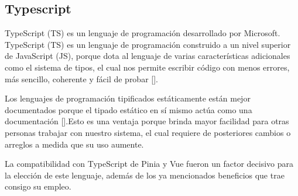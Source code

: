 %

\subsection{Typescript}

TypeScript (TS) es un lenguaje de programación desarrollado por Microsoft. TypeScript (TS) es un lenguaje de programación construido a un nivel superior de JavaScript (JS), porque dota al lenguaje de varias características adicionales como el sistema de tipos, el cual nos permite escribir código con menos errores, más sencillo, coherente y fácil de probar [\cite{58, 59}]. 

Los lenguajes de programación tipificados estáticamente están mejor documentados porque el tipado estático en sí mismo actúa como una documentación [\cite{58,60,61}].Esto es una ventaja porque brinda mayor facilidad para otras personas trabajar con nuestro sistema, el cual requiere de posteriores cambios o arreglos a medida que su uso aumente. 

La compatibilidad con TypeScript de Pinia y Vue fueron un factor decisivo para la elección de este lenguaje, además de los ya mencionados beneficios que trae consigo su empleo.


